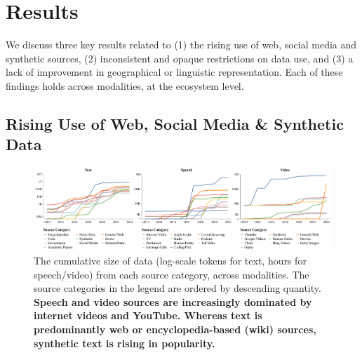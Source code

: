 \vspace{-2mm}
\section{Results}
\label{sec:results}

We discuss three key results related to (1) the rising use of web, social media and synthetic sources, (2) inconsistent and opaque restrictions on data use, and (3) a lack of improvement in geographical or linguistic representation.
Each of these findings holds across modalities, at the ecosystem level.

\vspace{-2mm}
\subsection{Rising Use of Web, Social Media \& Synthetic Data}
\label{sec:data-sources}

\begin{figure}[!htb]
    \centering
    \includegraphics[width=\textwidth]{figures/temporal-sources-v2.pdf}
    \caption{The cumulative size of data (log-scale tokens for text, hours for speech/video) from each source category, across modalities. The source categories in the legend are ordered by descending quantity. \textbf{Speech and video sources are increasingly dominated by internet videos and YouTube. Whereas text is predominantly web or encyclopedia-based (wiki) sources, synthetic text is rising in popularity.} }
    \label{fig:temporal-source-categories}
    \vspace{-3mm}
\end{figure}

\vspace{-2mm}
